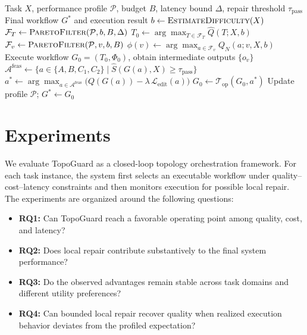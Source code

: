 \documentclass[manuscript,review,anonymous]{acmart}
\begin{document}
\begin{algorithm}[t]
\caption{TopoGuard Hierarchical Pareto Orchestration}
\label{alg:hpo}
\begin{algorithmic}[1]
\Require Task $X$, performance profile $\mathcal{P}$, budget $B$, latency bound $\Delta$, repair threshold $\tau_{\mathrm{pass}}$
\Ensure Final workflow $G^*$ and execution result
\State $b \gets \textsc{EstimateDifficulty}(X)$ 
\State $\mathcal{F}_T \gets \textsc{ParetoFilter}(\mathcal{P}, b, B, \Delta)$ 
\State $T_0 \gets \arg\max_{T \in \mathcal{F}_T} \hat{Q}(T; X, b)$ 
    \State $\mathcal{F}_v \gets \textsc{ParetoFilter}(\mathcal{P}, v, b, B)$ 
    \State $\phi(v) \gets \arg\max_{a \in \mathcal{F}_v} Q_N(a; v, X, b)$ 
\EndFor
\State Execute workflow $G_0 = (T_0, \Phi_0)$, obtain intermediate outputs $\{o_v\}$
     
        \State $\mathcal{A}^{\mathrm{feas}} \gets \{a \in \{A,B,C_1,C_2\} \mid \widehat{S}(G(a),X) \ge \tau_{\mathrm{pass}}\}$
        \State $a^* \gets \arg\max_{a \in \mathcal{A}^{\mathrm{feas}}} \bigl(Q(G(a)) - \lambda\,\mathcal{L}_{\mathrm{edit}}(a)\bigr)$
        \State $G_0 \gets \mathcal{T}_{\mathrm{op}}(G_0, a^*)$ 
    \EndIf
\EndFor
\State Update profile $\mathcal{P}$; \Return $G^* \gets G_0$
\end{algorithmic}
\end{algorithm}


\section{Experiments}
\label{sec:experiments}

We evaluate TopoGuard as a closed-loop topology orchestration framework. 
For each task instance, the system first selects an executable workflow under quality--cost--latency constraints and then monitors execution for possible local repair. 
The experiments are organized around the following questions:

\begin{itemize}
    \item \textbf{RQ1:} Can TopoGuard reach a favorable operating point among quality, cost, and latency?
    \item \textbf{RQ2:} Does local repair contribute substantively to the final system performance?
    \item \textbf{RQ3:} Do the observed advantages remain stable across task domains and different utility preferences?
    \item \textbf{RQ4:} Can bounded local repair recover quality when realized execution behavior deviates from the profiled expectation?
\end{itemize}
\end{document}
